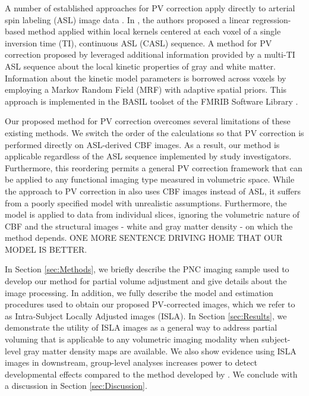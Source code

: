 \documentclass[review]{elsarticle}
\begin{document}
A number of established approaches for PV correction apply directly to arterial spin labeling (ASL) image data \citep{asllani2008regression, chappell2011partial}. In \citep{asllani2008regression}, the authors proposed a linear regression-based method applied within local kernels centered at each voxel of a single inversion time (TI), continuous ASL (CASL) sequence. A method for PV correction proposed by \citep{chappell2011partial} leveraged additional information provided by a multi-TI ASL sequence about the local kinetic properties of gray and white matter. Information about the kinetic model parameters is borrowed across voxels by employing a Markov Random Field (MRF) with adaptive spatial priors. This approach is implemented in the BASIL toolset \citep{chappell2008variational} of the FMRIB Software Library \citep{woolrich2009bayesian,smith2004advances,jenkinson2012fsl}.

Our proposed method for PV correction overcomes several limitations of these existing methods. We switch the order of the calculations so that PV correction is performed directly on ASL-derived CBF images. As a result, our method is applicable regardless of the ASL sequence implemented by study investigators. Furthermore, this reordering permits a general PV correction framework that can be applied to any functional imaging type measured in volumetric space. While the approach to PV correction in \citep{ahlgren2014partial} also uses CBF images instead of ASL, it suffers from a poorly specified model with unrealistic assumptions. Furthermore, the model is applied to data from individual slices, ignoring the volumetric nature of CBF and the structural images - white and gray matter density - on which the method depends. ONE MORE SENTENCE DRIVING HOME THAT OUR MODEL IS BETTER.

In Section \ref{sec:Methods}, we briefly describe the PNC imaging sample used to develop our method for partial volume  adjustment and give details about the image processing. In addition, we fully describe the model and estimation procedures used to obtain our proposed PV-corrected images, which we refer to as Intra-Subject Locally Adjusted images (ISLA). In Section
\ref{sec:Results}, we demonstrate the utility of ISLA images as a general way to address partial voluming that is applicable to any volumetric imaging modality when subject-level gray matter density maps are available. We also show evidence using ISLA images in downstream, group-level analyses increases power to detect developmental effects compared to the method developed by \citep{ahlgren2014partial}. We conclude with a discussion in Section \ref{sec:Discussion}. 
\end{document}
